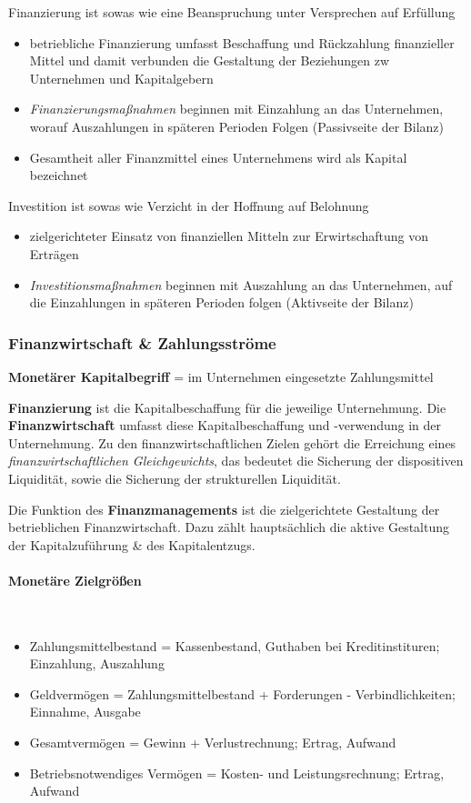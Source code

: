 \documentclass[11pt]{article}
\begin{document}
Finanzierung ist sowas wie eine Beanspruchung unter Versprechen auf Erfüllung
\begin{itemize}
\item betriebliche Finanzierung umfasst Beschaffung und Rückzahlung finanzieller Mittel und damit verbunden die Gestaltung der Beziehungen zw Unternehmen und Kapitalgebern
\item \emph{Finanzierungsmaßnahmen} beginnen mit Einzahlung an das Unternehmen, worauf Auszahlungen in späteren Perioden Folgen (Passivseite der Bilanz)
\item Gesamtheit aller Finanzmittel eines Unternehmens wird als Kapital bezeichnet
\end{itemize}

Investition ist sowas wie Verzicht in der Hoffnung auf Belohnung
\begin{itemize}
\item zielgerichteter Einsatz von finanziellen Mitteln zur Erwirtschaftung von Erträgen
\item \emph{Investitionsmaßnahmen} beginnen mit Auszahlung an das Unternehmen, auf die Einzahlungen in späteren Perioden folgen (Aktivseite der Bilanz)
\end{itemize}

\subsubsection{Finanzwirtschaft \& Zahlungsströme}
\label{sec:org49ab5dc}
\textbf{Monetärer Kapitalbegriff} = im Unternehmen eingesetzte Zahlungsmittel

\textbf{Finanzierung} ist die Kapitalbeschaffung für die jeweilige Unternehmung. Die \textbf{Finanzwirtschaft} umfasst diese Kapitalbeschaffung und -verwendung in der Unternehmung. Zu den finanzwirtschaftlichen Zielen gehört die Erreichung eines \emph{finanzwirtschaftlichen Gleichgewichts}, das bedeutet die Sicherung der dispositiven Liquidität, sowie die Sicherung der strukturellen Liquidität.

Die Funktion des \textbf{Finanzmanagements} ist die zielgerichtete Gestaltung der betrieblichen Finanzwirtschaft. Dazu zählt hauptsächlich die aktive Gestaltung der Kapitalzuführung \& des Kapitalentzugs.

\paragraph{Monetäre Zielgrößen}\\
\begin{itemize}
\item Zahlungsmittelbestand = Kassenbestand, Guthaben bei Kreditinstituren; Einzahlung, Auszahlung
\item Geldvermögen = Zahlungsmittelbestand + Forderungen - Verbindlichkeiten; Einnahme, Ausgabe
\item Gesamtvermögen = Gewinn + Verlustrechnung; Ertrag, Aufwand
\item Betriebsnotwendiges Vermögen = Kosten- und Leistungsrechnung; Ertrag, Aufwand
\end{itemize}
\end{document}
